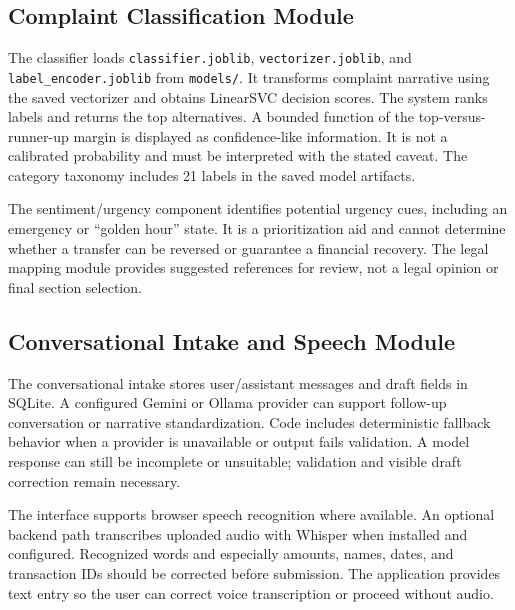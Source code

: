 \documentclass[12pt,a4paper,oneside]{report}
\begin{document}
\subsection{Complaint Classification Module}
The classifier loads \texttt{classifier.joblib}, \texttt{vectorizer.joblib}, and \texttt{label\_encoder.joblib} from \texttt{models/}. It transforms complaint narrative using the saved vectorizer and obtains LinearSVC decision scores. The system ranks labels and returns the top alternatives. A bounded function of the top-versus-runner-up margin is displayed as confidence-like information. It is not a calibrated probability and must be interpreted with the stated caveat. The category taxonomy includes 21 labels in the saved model artifacts.\par\medskip
The sentiment/urgency component identifies potential urgency cues, including an emergency or ``golden hour'' state. It is a prioritization aid and cannot determine whether a transfer can be reversed or guarantee a financial recovery. The legal mapping module provides suggested references for review, not a legal opinion or final section selection.\par\medskip
\subsection{Conversational Intake and Speech Module}
The conversational intake stores user/assistant messages and draft fields in SQLite. A configured Gemini or Ollama provider can support follow-up conversation or narrative standardization. Code includes deterministic fallback behavior when a provider is unavailable or output fails validation. A model response can still be incomplete or unsuitable; validation and visible draft correction remain necessary.\par\medskip
The interface supports browser speech recognition where available. An optional backend path transcribes uploaded audio with Whisper when installed and configured. Recognized words and especially amounts, names, dates, and transaction IDs should be corrected before submission. The application provides text entry so the user can correct voice transcription or proceed without audio.\par\medskip
\end{document}
